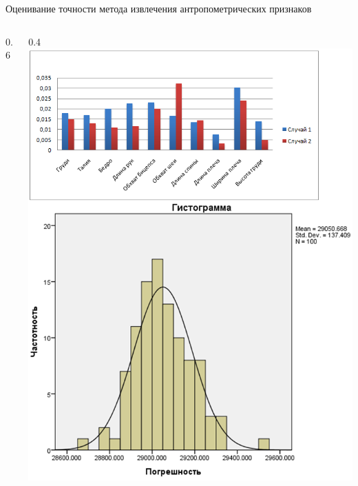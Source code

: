 \documentclass[10pt,pdf,hyperref={unicode},xcolor=table]{beamer}
\begin{document}
\begin{frame}{Оценивание точности метода извлечения антропометрических признаков}
\begin{columns}
\begin{column} {0.6\textwidth}
			\end{column}
			\begin{column} {0.4\textwidth}
		\includegraphics[width=0.9\linewidth]{p10}
			\end{column}      
		\end{columns}
\end{frame}
\end{document}
